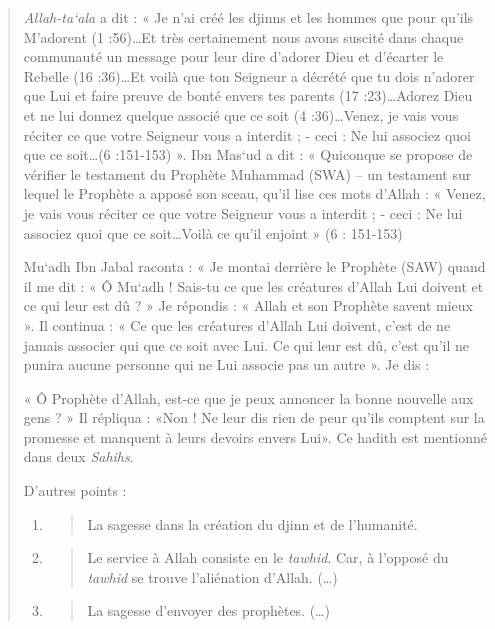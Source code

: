 \begin{quote}
\emph{Allah-ta`ala} a dit : « Je n'ai créé les djinns et les hommes que
pour qu'ils M'adorent (1 :56)\ldots Et très certainement nous avons
suscité dans chaque communauté un message pour leur dire d'adorer Dieu
et d'écarter le Rebelle (16 :36)\ldots Et voilà que ton Seigneur a
décrété que tu dois n'adorer que Lui et faire preuve de bonté envers tes
parents (17 :23)\ldots Adorez Dieu et ne lui donnez quelque associé que
ce soit (4 :36)\ldots Venez, je vais vous réciter ce que votre Seigneur
vous a interdit ; - ceci : Ne lui associez quoi que ce soit\ldots(6
:151-153) ». Ibn Mas`ud a dit : « Quiconque se propose de vérifier le
testament du Prophète Muhammad (SWA) -- un testament sur lequel le
Prophète a apposé son sceau, qu'il lise ces mots d'Allah : « Venez, je
vais vous réciter ce que votre Seigneur vous a interdit ; - ceci : Ne
lui associez quoi que ce soit\ldots Voilà ce qu'il enjoint » (6 :
151-153)


Mu`adh Ibn Jabal raconta : « Je montai derrière le Prophète (SAW) quand
il me dit : « Ô Mu`adh ! Sais-tu ce que les créatures d'Allah Lui
doivent et ce qui leur est dû ? » Je répondis : « Allah et son Prophète
savent mieux ». Il continua : « Ce que les créatures d'Allah Lui
doivent, c'est de ne jamais associer qui que ce soit avec Lui. Ce qui
leur est dû, c'est qu'il ne punira aucune personne qui ne Lui associe
pas un autre ». Je dis :

« Ô Prophète d'Allah, est-ce que je peux annoncer la bonne nouvelle aux
gens ? » Il répliqua : «Non ! Ne leur dis rien de peur qu'ils comptent
sur la promesse et manquent à leurs devoirs envers Lui». Ce hadith est
mentionné dans deux \emph{Sahihs}.


D'autres points :


\begin{enumerate}

\item
  \begin{quote}
  La sagesse dans la création du djinn et de l'humanité.
  \end{quote}
\item
  \begin{quote}
  Le service à Allah consiste en le \emph{tawhid}. Car, à l'opposé du
  \emph{tawhid} se trouve l'aliénation d'Allah. (\ldots)
  \end{quote}
\item
  \begin{quote}
  La sagesse d'envoyer des prophètes. (\ldots)
  \end{quote}
\end{enumerate}
  \end{quote}
  
